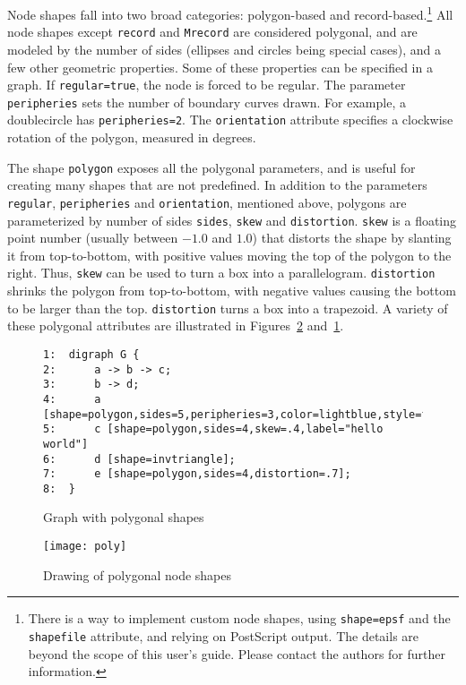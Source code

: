 \documentclass[11pt]{article}
\begin{document}
Node shapes fall into two broad categories: polygon-based and
record-based.\footnote{There is a way to implement custom node shapes,
using {\tt shape=epsf} and the {\tt shapefile} attribute, and
relying on PostScript output.
The details are beyond the scope of this user's guide.
Please contact the authors for further information.} All node
shapes except {\tt record} and {\tt Mrecord} are considered polygonal,
and are modeled by the number of sides (ellipses and circles being
special cases), and a few other geometric properties. Some of these
properties can be specified in a graph. If {\tt regular=true}, the
node is forced to be regular. The parameter {\tt peripheries} sets
the number of boundary curves drawn. For example, a doublecircle 
has {\tt peripheries=2}.
The {\tt orientation} attribute specifies a clockwise rotation of the 
polygon, measured in degrees.

The shape {\tt polygon} exposes all the polygonal parameters, and
is useful for creating many shapes that are not predefined.
In addition to the parameters {\tt regular}, {\tt peripheries} and
{\tt orientation}, mentioned above, polygons are parameterized by 
number of sides {\tt sides}, {\tt skew} and {\tt distortion}.
{\tt skew} is a floating point number (usually between $-1.0$ and $1.0$)
that distorts the shape by slanting it from top-to-bottom,
with positive values moving the top of the polygon to the right.
Thus, {\tt skew} can be used to turn a box into a parallelogram.
{\tt distortion} shrinks the polygon from top-to-bottom, with negative
values causing the bottom to be larger than the top. {\tt distortion}
turns a box into a trapezoid. A variety of these polygonal attributes
are illustrated in Figures~\ref{fig:polygons} and~\ref{fig:polylist}.

\begin{figure}[p]\footnotesize
\begin{verbatim}
1:  digraph G {
2:      a -> b -> c;
3:      b -> d;
4:      a [shape=polygon,sides=5,peripheries=3,color=lightblue,style=filled];
5:      c [shape=polygon,sides=4,skew=.4,label="hello world"]
6:      d [shape=invtriangle];
7:      e [shape=polygon,sides=4,distortion=.7];
8:  }
\end{verbatim}
\caption{Graph with polygonal shapes}
\label{fig:polylist}
\end{figure}
\begin{figure}[p]
	\centerline {
		\texttt{[image: poly]}
	}
    \caption{Drawing of polygonal node shapes}
    \label{fig:polygons}
    \vspace*{.5in} %
\end{figure}
\end{document}
